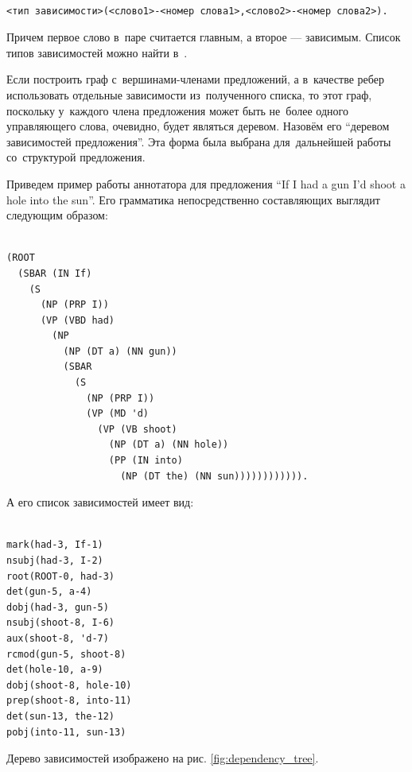 \begin{verbatim}

<тип зависимости>(<слово1>-<номер слова1>,<слово2>-<номер слова2>).

\end{verbatim}

Причем первое слово в~паре считается главным, а второе --- зависимым.
Список типов зависимостей можно найти в~\cite{dependencies}.

Если построить граф с~вершинами-членами предложений, а в~качестве ребер использовать отдельные зависимости из~полученного списка, 
то этот граф, поскольку у~каждого члена предложения может быть не~более одного управляющего слова, 
очевидно, будет являться деревом. 
Назовём его ``деревом зависимостей предложения''.
Эта форма была выбрана для~дальнейшей работы со~структурой предложения.

Приведем пример работы аннотатора для предложения ``If I had a gun I'd shoot a hole into the sun''.
Его грамматика непосредственно составляющих выглядит следующим образом:

\begin{verbatim}

(ROOT
  (SBAR (IN If)
    (S
      (NP (PRP I))
      (VP (VBD had)
        (NP
          (NP (DT a) (NN gun))
          (SBAR
            (S
              (NP (PRP I))
              (VP (MD 'd)
                (VP (VB shoot)
                  (NP (DT a) (NN hole))
                  (PP (IN into)
                    (NP (DT the) (NN sun)))))))))))).

\end{verbatim}

А его список зависимостей имеет вид:

\begin{verbatim}

mark(had-3, If-1)
nsubj(had-3, I-2)
root(ROOT-0, had-3)
det(gun-5, a-4)
dobj(had-3, gun-5)
nsubj(shoot-8, I-6)
aux(shoot-8, 'd-7)
rcmod(gun-5, shoot-8)
det(hole-10, a-9)
dobj(shoot-8, hole-10)
prep(shoot-8, into-11)
det(sun-13, the-12)
pobj(into-11, sun-13)

\end{verbatim}

Дерево зависимостей изображено на рис. \ref{fig:dependency_tree}.

